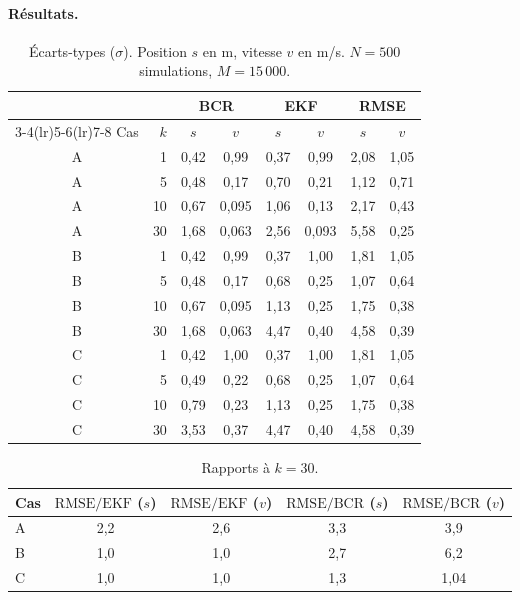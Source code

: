 \documentclass[11pt,a4paper]{article}
\newcommand{\BCR}{\mathrm{BCR}}
\newcommand{\RMSE}{\mathrm{RMSE}}
\newcommand{\EKF}{\mathrm{EKF}}
\theoremstyle{remark}
\begin{document}
\paragraph{Résultats.}

\begin{table}[ht]
\centering
\caption{Écarts-types ($\sigma$). Position $s$ en m, vitesse $v$ en m/s. $N = 500$ simulations, $M = 15\,000$.}
\label{tab:resultats}
\begin{tabular}{cr cc cc cc}
\toprule
& & \multicolumn{2}{c}{BCR} & \multicolumn{2}{c}{EKF} & \multicolumn{2}{c}{RMSE} \\
\cmidrule(lr){3-4}\cmidrule(lr){5-6}\cmidrule(lr){7-8}
Cas & $k$ & $s$ & $v$ & $s$ & $v$ & $s$ & $v$ \\
\midrule
A & 1  & 0,42 & 0,99  & 0,37 & 0,99  & 2,08 & 1,05 \\
A & 5  & 0,48 & 0,17  & 0,70 & 0,21  & 1,12 & 0,71 \\
A & 10 & 0,67 & 0,095 & 1,06 & 0,13  & 2,17 & 0,43 \\
A & 30 & 1,68 & 0,063 & 2,56 & 0,093 & 5,58 & 0,25 \\
\midrule
B & 1  & 0,42 & 0,99  & 0,37 & 1,00  & 1,81 & 1,05 \\
B & 5  & 0,48 & 0,17  & 0,68 & 0,25  & 1,07 & 0,64 \\
B & 10 & 0,67 & 0,095 & 1,13 & 0,25  & 1,75 & 0,38 \\
B & 30 & 1,68 & 0,063 & 4,47 & 0,40  & 4,58 & 0,39 \\
\midrule
C & 1  & 0,42 & 1,00  & 0,37 & 1,00  & 1,81 & 1,05 \\
C & 5  & 0,49 & 0,22  & 0,68 & 0,25  & 1,07 & 0,64 \\
C & 10 & 0,79 & 0,23  & 1,13 & 0,25  & 1,75 & 0,38 \\
C & 30 & 3,53 & 0,37  & 4,47 & 0,40  & 4,58 & 0,39 \\
\bottomrule
\end{tabular}
\end{table}

\begin{table}[ht]
\centering
\caption{Rapports à $k = 30$.}
\label{tab:rapports}
\begin{tabular}{lcccc}
\toprule
Cas & $\RMSE/\EKF$ ($s$) & $\RMSE/\EKF$ ($v$) & $\RMSE/\BCR$ ($s$) & $\RMSE/\BCR$ ($v$) \\
\midrule
A & 2,2 & 2,6 & 3,3 & 3,9 \\
B & 1,0 & 1,0 & 2,7 & 6,2 \\
C & 1,0 & 1,0 & 1,3 & 1,04 \\
\bottomrule
\end{tabular}
\end{table}
\end{document}
